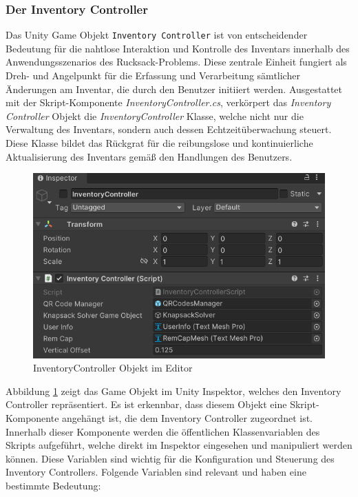 \begin{itemize}
\subsubsection{Der Inventory Controller}
Das Unity Game Objekt \texttt{Inventory Controller} ist von entscheidender Bedeutung für die nahtlose Interaktion und
Kontrolle des Inventars innerhalb des Anwendungsszenarios des Rucksack-Problems. Diese zentrale Einheit fungiert als Dreh-
und Angelpunkt für die Erfassung und Verarbeitung sämtlicher Änderungen am Inventar, die durch den Benutzer initiiert
werden. Ausgestattet mit der Skript-Komponente \textit{InventoryController.cs}, verkörpert das \textit{Inventory Controller}
Objekt die \textit{InventoryController} Klasse, welche nicht nur die Verwaltung des Inventars, sondern auch dessen
Echtzeitüberwachung steuert. Diese Klasse bildet das Rückgrat für die reibungslose und kontinuierliche Aktualisierung
des Inventars gemäß den Handlungen des Benutzers.

\begin{figure}[H]
    \centering
    \includegraphics[scale=0.7]{images/invCon_Editor}
    \caption{InventoryController Objekt im Editor}
    \label{fig:InventoryController_Editor}
\end{figure}

Abbildung \ref{fig:InventoryController_Editor} zeigt das Game Objekt im Unity Inspektor, welches den Inventory Controller
repräsentiert. Es ist erkennbar, dass diesem Objekt eine Skript-Komponente angehängt ist, die dem Inventory Controller
zugeordnet ist. Innerhalb dieser Komponente werden die öffentlichen Klassenvariablen des Skripts aufgeführt, welche direkt
im Inspektor eingesehen und manipuliert werden können. Diese Variablen sind wichtig für die Konfiguration und Steuerung
des Inventory Controllers. Folgende Variablen sind relevant und haben eine bestimmte Bedeutung:


\end{itemize}

